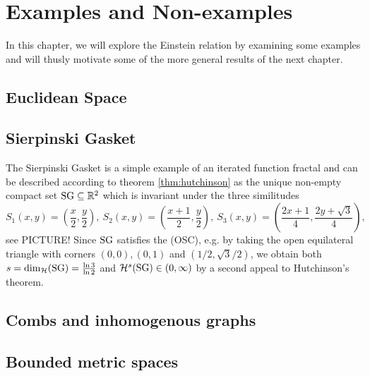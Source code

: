 \chapter{Examples and Non-examples}

In this chapter, we will explore the Einstein relation by examining some examples and will thusly motivate some of the more general results of the next chapter.

\section{Euclidean Space}

\section{Sierpinski Gasket}

The Sierpinski Gasket is a simple example of an iterated function fractal and can be described according to theorem \ref{thm:hutchinson} as the unique non-empty compact set $\operatorname{SG}\subseteq\mathbb{R}^2$ which is invariant under the three similitudes 
\[
  S_1(x,y)=\left(\frac{x}{2},\frac{y}{2}\right),\ 
  S_2(x,y)=\left(\frac{x+1}{2},\frac{y}{2}\right),\ 
  S_3(x,y)=\left(\frac{2x+1}{4},\frac{2y+\sqrt{3}}{4}\right),
\]
see PICTURE! Since $\operatorname{SG}$ satisfies the (OSC), e.g. by taking the open equilateral triangle with corners $(0,0), (0,1)$ and $(1/2,\sqrt{3}/2)$, we obtain both $s=\dim_{\mathcal{H}}(\operatorname{SG})=\frac{\ln 3}{\ln 2}$ and $\mathcal{H}^s(\operatorname{SG})\in(0,\infty)$ by a second appeal to Hutchinson's theorem.


\section{Combs and inhomogenous graphs}

\section{Bounded metric spaces}